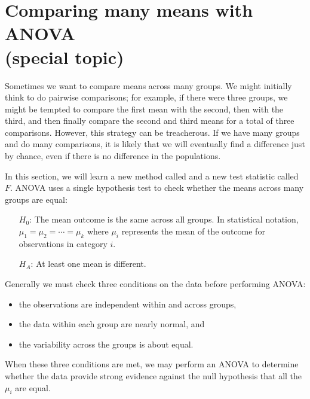 \section[Comparing many means with ANOVA (special topic)]{Comparing many means with ANOVA\\(special topic)}
\label{anovaAndRegrWithCategoricalVariables}


Sometimes we want to compare means across many groups. We might initially think to do pairwise comparisons; for example, if there were three groups, we might be tempted to compare the first mean with the second, then with the third, and then finally compare the second and third means for a total of three comparisons. However, this strategy can be treacherous. If we have many groups and do many comparisons, it is likely that we will eventually find a difference just by chance, even if there is no difference in the populations.

In this section, we will learn a new method called  and a new test statistic called $F$. ANOVA uses a single hypothesis test to check whether the means across many groups are equal:
\begin{itemize}
\setlength{\itemsep}{0mm}
\item[$H_0$:] The mean outcome is the same across all groups. In statistical notation, $\mu_1 = \mu_2 = \cdots = \mu_k$ where $\mu_i$ represents the mean of the outcome for observations in category $i$.
\item[$H_A$:] At least one mean is different.
\end{itemize}
Generally we must check three conditions on the data before performing ANOVA:
\begin{itemize}
\setlength{\itemsep}{0mm}
\item the observations are independent within and across groups,
\item the data within each group are nearly normal, and
\item the variability across the groups is about equal.
\end{itemize}
When these three conditions are met, we may perform an ANOVA to determine whether the data provide strong evidence against the null hypothesis that all the $\mu_i$ are equal.

